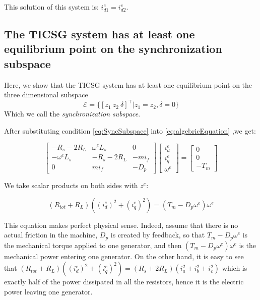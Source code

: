 \documentclass[letterpaper, 10 pt, conference]{ieeeconf}  %
\begin{document}
This solution of this system is: $i_{d1}^{e}=i_{d2}^{e}$.



\subsection{The TICSG system has at least one equilibrium point on the synchronization subspace}
Here, we show that the TICSG system has at least one equilibrium point on the three dimensional subspace
\begin{equation}
\mathscr{E}=\{ \left[z_1 \ z_2 \ \delta  \right]^\top   |   z_1=z_2,\delta= 0\}\label{eq:SyncSubspace}
\end{equation}
Which we call the \textit{synchronization subspace}.

After substituting condition \eqref{eq:SyncSubspace} into \eqref{eq:algebricEquation} ,we get:

\begin{equation}
\left[\begin{array}{ccc}
-R_{s}-2R_{L} & \omega^{e}L_{s} & 0\\
-\omega^{e}L_{s} & -R_{s}-2R_{L} & -mi_{f}\\
0 & mi_{f} & -D_{p}
\end{array}\right]\left[\begin{array}{c}
i_{d}^{e}\\
i_{q}^{e}\\
\omega^{e}
\end{array}\right]=\left[\begin{array}{c}
0\\
0\\
-T_{m}
\end{array}\right]\label{eq:equilbrium_algebric_eq}
\end{equation}

We take scalar products on both sides with $z^{e}$:

\[
\left(R_{tot}+R_{L}\right)\left((i_{d}^{e})^{2}+(i_{q}^{e})^{2}\right)=\left(T_{m}-D_{p}\omega^{e}\right)\omega^{e}
\]

This equation makes perfect physical sense. Indeed, assume that there
is no actual friction in the machine, $D_{p}$ is created by feedback,
so that $T_{m}-D_{p}\omega^{e}$ is the mechanical torque applied
to one generator, and then $\left(T_{m}-D_{p}\omega^{e}\right)\omega^{e}$
is the mechanical power entering one generator. On the other hand,
it is easy to see that $\left(R_{tot}+R_{L}\right)\left((i_{d}^{e})^{2}+(i_{q}^{e})^{2}\right)=\left(R_{s}+2R_{L}\right)\left(i_{a}^{2}+i_{b}^{2}+i_{c}^{2}\right)$
which is exactly half of the power dissipated in all the resistors,
hence it is the electric power leaving one generator.
\end{document}
